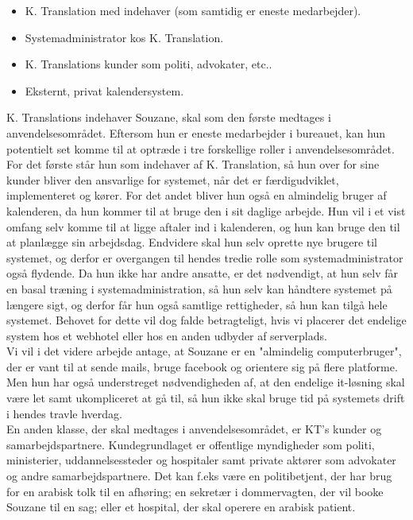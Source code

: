 \documentclass[12pt]{article}   %
\begin{document}
\begin{itemize}
\item K. Translation med indehaver (som samtidig er eneste medarbejder).
\item Systemadministrator kos K. Translation.
\item K. Translations kunder som politi, advokater, etc..
\item Eksternt, privat kalendersystem.
\end{itemize}

K. Translations indehaver Souzane, skal som den første medtages i anvendelsesområdet. Eftersom hun er eneste medarbejder i bureauet, kan hun potentielt set komme til at optræde i tre forskellige roller i anvendelsesområdet. For det første står hun som indehaver af K. Translation, så hun over for sine kunder bliver den ansvarlige for systemet, når det er færdigudviklet, implementeret og kører. For det andet bliver hun også en almindelig bruger af kalenderen, da hun kommer til at bruge den i sit daglige arbejde. Hun vil i et vist omfang selv komme til at ligge aftaler ind i kalenderen, og hun kan bruge den til at planlægge sin arbejdsdag. Endvidere skal hun selv oprette nye brugere til systemet, og derfor er overgangen til hendes tredie rolle som systemadministrator også flydende. Da hun ikke har andre ansatte, er det nødvendigt, at hun selv får en basal træning i systemadministration, så hun selv kan håndtere systemet på længere sigt, og derfor får hun også samtlige rettigheder, så hun kan tilgå hele systemet. Behovet for dette vil dog falde betragteligt, hvis vi placerer det endelige system hos et webhotel eller hos en anden udbyder af serverplads. \\
Vi vil i det videre arbejde antage, at Souzane er en "almindelig computerbruger", der er vant til at sende mails, bruge facebook og orientere sig på flere platforme. Men hun har også understreget nødvendigheden af, at den endelige it-løsning skal være let samt ukompliceret at gå til, så hun ikke skal bruge tid på systemets drift i hendes travle hverdag. \\
En anden klasse, der skal medtages i anvendelsesområdet, er KT's kunder og samarbejdspartnere. Kundegrundlaget er  
offentlige myndigheder som politi, ministerier, uddannelsessteder og hospitaler samt private aktører som advokater og andre samarbejdspartnere. Det kan f.eks være en politibetjent, der har brug for en arabisk tolk til en afhøring; en sekretær i dommervagten, der vil booke Souzane til en sag; eller et hospital, der skal operere en arabisk patient. \\
\end{document}
